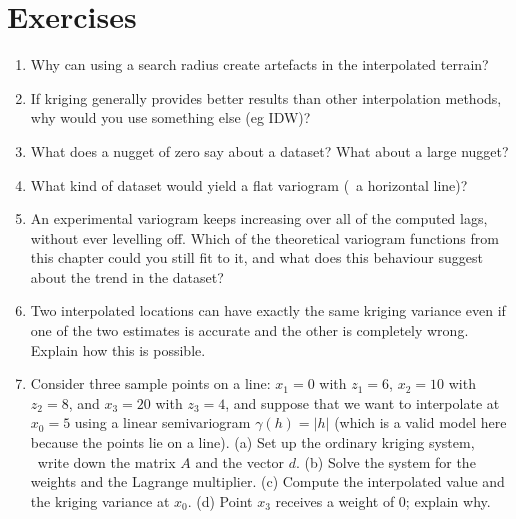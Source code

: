 %
\section{Exercises}

\begin{enumerate}
\item Why can using a search radius create artefacts in the interpolated terrain?
\item If kriging generally provides better results than other interpolation methods, why would you use something else (eg IDW)?
\item What does a nugget of zero say about a dataset? What about a large nugget?
\item What kind of dataset would yield a flat variogram (\ie\ a horizontal line)?
\item An experimental variogram keeps increasing over all of the computed lags, without ever levelling off. Which of the theoretical variogram functions from this chapter could you still fit to it, and what does this behaviour suggest about the trend in the dataset?
\item Two interpolated locations can have exactly the same kriging variance even if one of the two estimates is accurate and the other is completely wrong. Explain how this is possible.
\item Consider three sample points on a line: \(x_1 = 0\) with \(z_1 = 6\), \(x_2 = 10\) with \(z_2 = 8\), and \(x_3 = 20\) with \(z_3 = 4\), and suppose that we want to interpolate at \(x_0 = 5\) using a linear semivariogram \(\gamma(h) = |h|\) (which is a valid model here because the points lie on a line).
(a) Set up the ordinary kriging system, \ie\ write down the matrix \(A\) and the vector \(d\).
(b) Solve the system for the weights and the Lagrange multiplier.
(c) Compute the interpolated value and the kriging variance at \(x_0\).
(d) Point \(x_3\) receives a weight of 0; explain why.

\end{enumerate}
